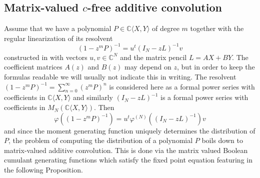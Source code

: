 \documentclass[12pt]{amsart}
\theoremstyle{definition}
\numberwithin{equation}{section}
\begin{document}
		
		
		
		
		

\subsection{Matrix-valued $c$-free additive convolution}

Assume that we have a polynomial $P\in \mathbb{C}\langle X,Y\rangle$ of degree 
$m$ together with the regular linearization of its resolvent
$$
(1-z^mP)^{-1} = u^t(I_N-zL)^{-1}v
$$
constructed in \cite[Appendix]{LehnerSzpojankowski:2023:freeint1}
with vectors $u,v\in \mathbb{C}^N$ and the matrix pencil $L=A X+BY$.
The coefficient matrices $A(z)$ and $B(z)$ may depend on $z$, but in order to keep
the formulas readable we will usually not indicate this in writing.
The resolvent $(1-z^mP)^{-1}=\sum_{n=0}^{\infty} (z^mP)^n$ is considered here
as
a formal power series with coefficients in $\mathbb{C}\langle X,Y\rangle$ and similarly $(I_N-zL)^{-1}$ is a formal power series with coefficients in $M_N(\mathbb{C}\langle X,Y\rangle)$. 
Then
\[\varphi\left((1-z^m
    P)^{-1}\right)=u^t\varphi^{(N)}\left((I_N-zL)^{-1}\right)v
\]
and since 
the moment generating function uniquely determines the distribution of $P$, the
problem of computing the distribution of a polynomial $P$ boils down to
matrix-valued additive convolution.
This is done via the matrix valued Boolean cumulant generating functions which
satisfy the fixed point equation featuring in the following Proposition.
\end{document}
